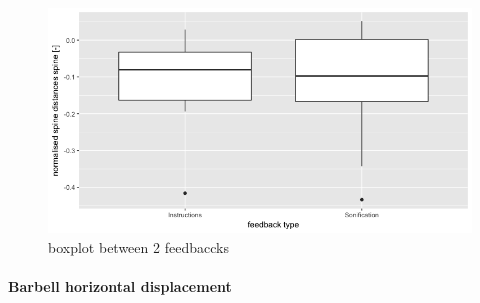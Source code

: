 \documentclass[10pt,letterpaper]{article}
\begin{document}
\begin{figure}[!ht] 
    \includegraphics[width=.45\textwidth]{figures/boxplot.png}
\caption{boxplot between 2 feedbaccks}
\label{fig:boxplot} 
\end{figure}


\paragraph{Barbell horizontal displacement}







%
%
%
%
\end{document}
